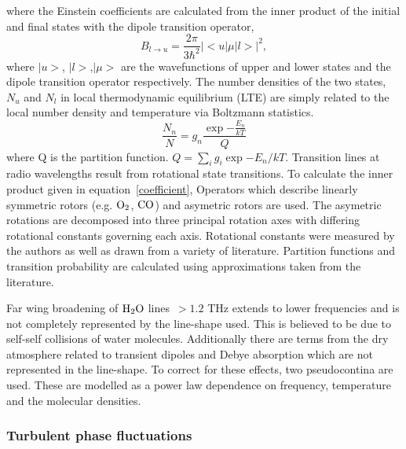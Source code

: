 \noindent where the Einstein coefficients are calculated from the inner product of the initial and final states with the dipole transition operator,\begin{equation}\label{coefficient}
B_{l \to u} = \frac{2\pi}{3\hbar^2} |<u|\mu|l>|^2,
\end{equation}
where $|u>$, $|l>$,$|\mu>$ are the wavefunctions of upper and lower states and the dipole transition operator respectively. The number densities of the two states, $N_u$ and $N_l$ in local thermodynamic equilibrium (LTE) are simply related to the local number density and temperature via Boltzmann statistics. 
\begin{equation}
\frac{N_n}{N} = g_n \frac {\exp{-\frac{E_n}{kT}}}{Q}
\end{equation}
where Q is the partition function. $Q = \sum_i g_i  \exp{-E_n/kT}$. 
Transition lines at radio wavelengths result from rotational state transitions. To calculate the inner product given in equation~\ref{coefficient}, Operators which describe linearly symmetric rotors (e.g. ${\rm O_2}$, ${\rm CO}$) and asymetric rotors are used. The asymetric rotations are decomposed into three principal rotation axes with differing rotational constants governing each axis. Rotational constants were measured by the authors as well as drawn from a variety of literature. Partition functions and transition probability are calculated using approximations taken from the literature.
 

Far wing broadening of ${\rm H_2O}$ lines~$> 1.2$ THz extends to lower frequencies and is not completely represented by the line-shape used. This is believed to be due to self-self collisions of water molecules. Additionally there are terms from the dry atmosphere related to transient dipoles and Debye absorption which are not represented in the line-shape. To correct for these effects, two pseudocontina are used. These are modelled as a power law dependence on frequency, temperature and the molecular densities. 


\subsubsection{Turbulent phase fluctuations}\label{sec:turb_theory}

